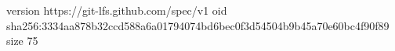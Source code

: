 version https://git-lfs.github.com/spec/v1
oid sha256:3334aa878b32ccd588a6a01794074bd6bec0f3d54504b9b45a70e60bc4f90f89
size 75
